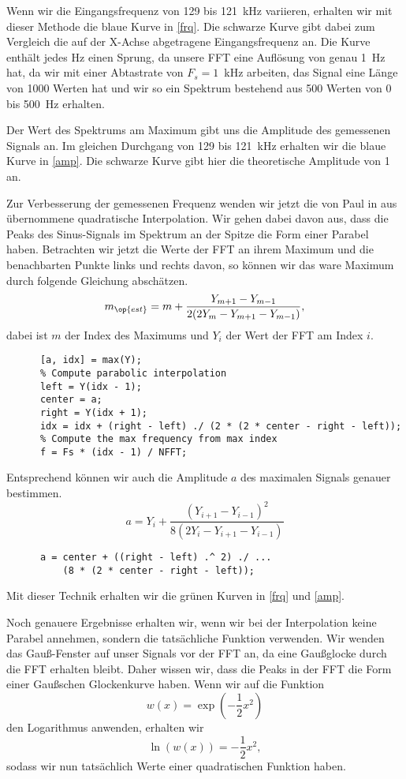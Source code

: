 \documentclass{exercise}
\begin{document}
    Wenn wir die Eingangsfrequenz von 129 bis 121~kHz variieren, erhalten wir mit dieser Methode die blaue Kurve in \autoref{frq}. Die schwarze Kurve gibt dabei zum Vergleich die auf der X-Achse abgetragene Eingangsfrequenz an. Die Kurve enthält jedes Hz einen Sprung, da unsere FFT eine Auflösung von genau 1~Hz hat, da wir mit einer Abtastrate von $F_s = 1$~kHz arbeiten, das Signal eine Länge von 1000 Werten hat und wir so ein Spektrum bestehend aus 500 Werten von 0 bis 500~Hz erhalten.

    Der Wert des Spektrums am Maximum gibt uns die Amplitude des gemessenen Signals an. Im gleichen Durchgang von 129 bis 121~kHz erhalten wir die blaue Kurve in \autoref{amp}. Die schwarze Kurve gibt hier die theoretische Amplitude von 1 an.

    Zur Verbesserung der gemessenen Frequenz wenden wir jetzt die von Paul in aus \cite{marek} übernommene quadratische Interpolation. Wir gehen dabei davon aus, dass die Peaks des Sinus-Signals im Spektrum an der Spitze die Form einer Parabel haben. Betrachten wir jetzt die Werte der FFT an ihrem Maximum und die benachbarten Punkte links und rechts davon, so können wir das ware Maximum durch folgende Gleichung abschätzen.
    \[ m_{\op{est}} = m + \frac{Y_{m+1} - Y_{m-1}}{2(2Y_m - Y_{m+1} - Y_{m-1})}, \]
    dabei ist $m$ der Index des Maximums und $Y_i$ der Wert der FFT am Index $i$.
    \begin{lstlisting}[gobble=6]
      % Get the maximum in the spectrum
      [a, idx] = max(Y);
      % Compute parabolic interpolation
      left = Y(idx - 1);
      center = a;
      right = Y(idx + 1);
      idx = idx + (right - left) ./ (2 * (2 * center - right - left));
      % Compute the max frequency from max index
      f = Fs * (idx - 1) / NFFT;
    \end{lstlisting}

    Entsprechend können wir auch die Amplitude $a$ des maximalen Signals genauer bestimmen.
    \[ a = Y_i + \frac{(Y_{i+1} - Y_{i-1})^2}{8(2Y_i - Y_{i+1} - Y_{i-1})} \]
    \begin{lstlisting}[gobble=6]
      % Compute parabolic interpolation of amplitude
      a = center + ((right - left) .^ 2) ./ ...
          (8 * (2 * center - right - left));
    \end{lstlisting}

    Mit dieser Technik erhalten wir die grünen Kurven in \autoref{frq} und \autoref{amp}.

    Noch genauere Ergebnisse erhalten wir, wenn wir bei der Interpolation keine Parabel annehmen, sondern die tatsächliche Funktion verwenden. Wir wenden das Gauß-Fenster auf unser Signals vor der FFT an, da eine Gaußglocke durch die FFT erhalten bleibt. Daher wissen wir, dass die Peaks in der FFT die Form einer Gaußschen Glockenkurve haben. Wenn wir auf die Funktion
    \[ w(x) = \exp\left(-\frac12 x^2\right) \]
    den Logarithmus anwenden, erhalten wir
    \[ \ln(w(x)) = -\frac12 x^2, \]
    sodass wir nun tatsächlich Werte einer quadratischen Funktion haben.
\end{document}
